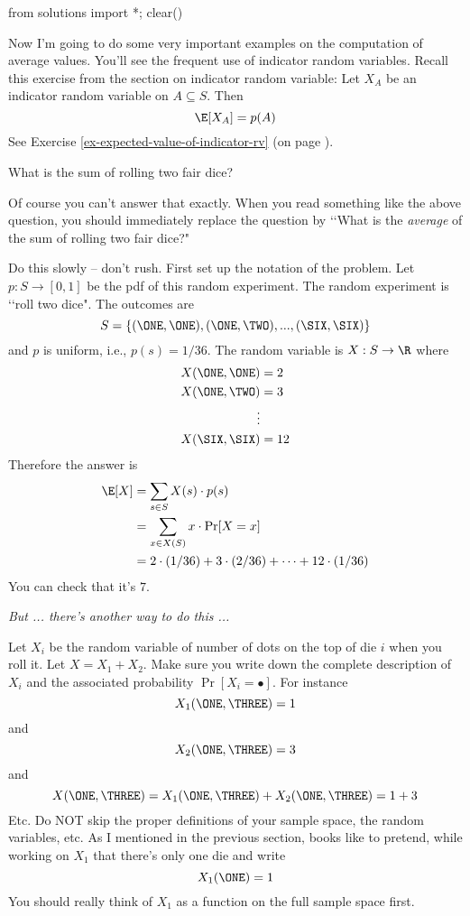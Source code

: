 \begin{python0}
from solutions import *; clear()
\end{python0}

Now I'm going to do some very important examples on the
computation of average values.
You'll see the frequent use of indicator random variables.
Recall this exercise from the section on indicator random variable:
Let $X_A$ be an indicator random variable
on $A \subseteq S$.
Then
\[
  \E[X_A] = p(A)
\]
See Exercise \ref{ex-expected-value-of-indicator-rv}
(on page \pageref{ex-expected-value-of-indicator-rv}).

\begin{eg}
  What is the sum of rolling two fair dice?
\end{eg}

Of course you can't answer that exactly.
When you read something like the above question,
you should immediately
replace the question by
\lq\lq What is the \textit{average} of the sum of
rolling two fair dice?"

Do this slowly -- don't rush.
First set up the notation of the problem.
Let $p : S \rightarrow [0, 1]$ be the pdf
of this random experiment.
The random experiment is \lq\lq roll two dice".
The outcomes are
\[
  S = \{(\ONE, \ONE), (\ONE, \TWO), ..., (\SIX,\SIX)\}
\]
and $p$ is uniform, i.e., $p(s) = 1/36$.
The random variable is $X : S \rightarrow \R$
where
\begin{align*}
  X(\ONE, \ONE) &= 2 \\
  X(\ONE, \TWO) &= 3 \\
  \vdots \\
  X(\SIX, \SIX) &= 12
\end{align*}
Therefore the answer is
\begin{align*}
  \E[X]
  &= \sum_{s \in S} X(s) \cdot p(s)
    \\
  &= \sum_{x \in X(S)} x \cdot \Pr[X = x]
    \\
  &= 2 \cdot (1/36) + 3 \cdot (2/36) + \cdots + 12 \cdot (1/36)
\end{align*}
You can check that it's $7$.

\textit{But ... there's another way to do this ...}

Let $X_i$ be the random variable of
number of dots on the top of die $i$ when you roll it.
Let $X = X_1 + X_2$.
Make sure you write down the complete
description of $X_i$ and the associated
probability $\Pr[X_i = \bullet]$.
For instance
\[
  X_1(\ONE, \THREE) = 1
\]
and
\[
  X_2(\ONE, \THREE) = 3
\]
and
\[
  X(\ONE, \THREE) = X_1(\ONE, \THREE) + X_2(\ONE, \THREE) = 1 + 3
\]
Etc.
Do NOT skip the proper definitions of your
sample space, the random variables, etc.
As I mentioned in the previous section,
books like to pretend, while working on $X_1$
that there's only one die and write
\[
  X_1(\ONE) = 1
\]
You should really think of $X_1$ as a function
on the full sample space first.

